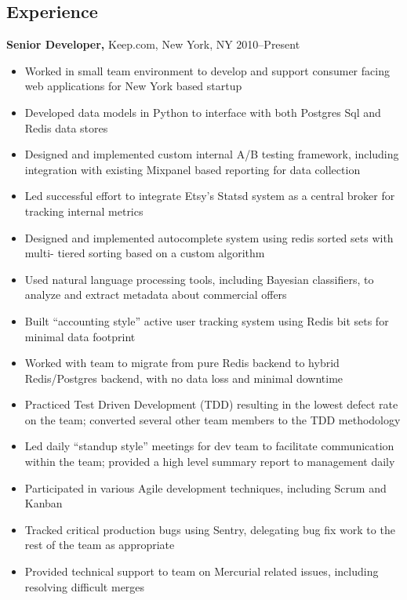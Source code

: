\documentclass[margin]{res}
\begin{document}
\begin{resume}
\section{Experience}
 {\bf Senior Developer,} Keep.com, New York, NY \hfill 2010--Present
\begin{itemize}
  \item Worked in small team environment to develop and support consumer facing web applications for New York based startup
  \item Developed data models in Python to interface with both Postgres Sql and Redis data stores
  \item Designed and implemented custom internal A/B testing framework, including integration with existing Mixpanel based reporting for data collection
  \item Led successful effort to integrate Etsy's Statsd system as a central broker for tracking internal metrics
  \item Designed and implemented autocomplete system using redis sorted sets with multi- tiered sorting based on a custom algorithm
  \item Used natural language processing tools, including Bayesian classifiers, to analyze and extract metadata about commercial offers
  \item Built “accounting style” active user tracking system using Redis bit sets for minimal data footprint
  \item Worked with team to migrate from pure Redis backend to hybrid Redis/Postgres backend, with no data loss and minimal downtime
  \item Practiced Test Driven Development (TDD) resulting in the lowest defect rate on the team; converted several other team members to the TDD methodology
  \item Led daily “standup style” meetings for dev team to facilitate communication within the team; provided a high level summary report to management daily
  \item Participated in various Agile development techniques, including Scrum and Kanban
  \item Tracked critical production bugs using Sentry, delegating bug fix work to the rest of the team as appropriate
  \item Provided technical support to team on Mercurial related issues, including resolving difficult merges
\end{itemize}


\end{resume}
\end{document}

